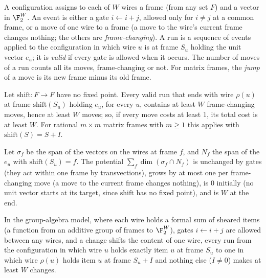 \begin{definition}[Runs]\label{def:frame-runs}
A configuration assigns to each of $W$ wires a frame (from any set $F$) and a vector in $\F_2^W$. An
event is either a gate $i\leftarrow i+j$, allowed only for $i\ne j$ at a common frame, or a move of one wire to a frame (a move to the wire's current frame changes nothing; the others are \emph{frame-changing}). A run is a sequence of events applied to the configuration in which wire $u$ is at frame $S_u$ holding the unit vector $e_u$; it is \emph{valid} if every gate is allowed when it occurs. The number of moves of a run counts all its moves, frame-changing or not. For matrix frames, the \emph{jump} of a move is its new frame minus its old frame.
\end{definition}

\begin{theorem}\label{thm:frame-change}
Let $\mathrm{shift}:F\to F$ have no fixed point. Every valid run that ends with wire $\rho(u)$ at frame
$\mathrm{shift}(S_u)$ holding $e_u$, for every $u$, contains at least $W$ frame-changing moves, hence at least $W$ moves; so, if every move costs at least $1$, its total cost is at least $W$. For rational $m\times m$ matrix frames with $m\ge1$ this applies with $\mathrm{shift}(S)=S+I$.
\end{theorem}

\begin{outline}
Let $\sigma_f$ be the span of the vectors on the wires at frame $f$, and $N_f$ the span of the $e_u$ with
$\mathrm{shift}(S_u)=f$. The potential $\sum_f\dim(\sigma_f\cap N_f)$ is unchanged by gates (they act
within one frame by transvections), grows by at most one per frame-changing move (a move to the current frame changes nothing), is $0$ initially (no unit vector starts
at its target, since $\mathrm{shift}$ has no fixed point), and is $W$ at the end.
\end{outline}

\begin{theorem}\label{thm:group-algebra}
In the group-algebra model, where each wire holds a formal sum of sheared items (a function from an
additive group of frames to $\F_2^W$), gates $i\leftarrow i+j$ are allowed between any wires, and a change
shifts the content of one wire, every run from the configuration in which wire $u$ holds exactly item $u$ at frame $S_u$ to one in which
wire $\rho(u)$ holds item $u$ at frame $S_u+I$ and nothing else ($I\ne0$) makes at least $W$ changes.
\end{theorem}

